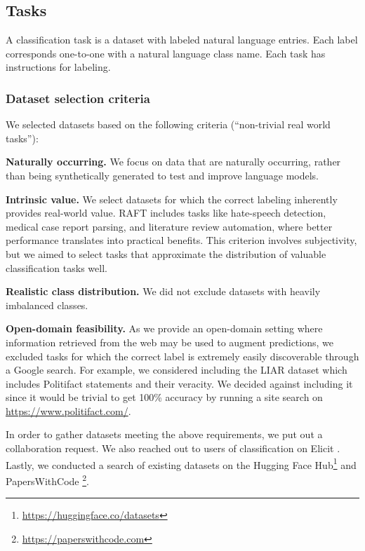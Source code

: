 \documentclass{article}
\newcommand{\name}{\textsc{RAFT}}
\begin{document}
\subsection{Tasks}

A classification task is a dataset with labeled natural language entries. Each label corresponds one-to-one with a natural language class name. Each task has instructions for labeling.

\subsubsection{Dataset selection criteria}
\label{sec:dataset-selection}

We selected datasets based on the following criteria (``non-trivial real world tasks''):

\textbf{Naturally occurring.} We focus on data that are naturally occurring, rather than being synthetically generated to test and improve language models.

\textbf{Intrinsic value.} We select datasets for which the correct labeling inherently provides real-world value.  \name{} includes tasks like hate-speech detection, medical case report parsing, and literature review automation, where better performance translates into practical benefits. This criterion involves subjectivity, but we aimed to select tasks that approximate the distribution of valuable classification tasks well.

\textbf{Realistic class distribution.} We did not exclude datasets with heavily imbalanced classes.

\textbf{Open-domain feasibility.} As we provide an open-domain setting where information retrieved from the web may be used to augment predictions, we excluded tasks for which the correct label is extremely easily discoverable through a Google search. For example, we considered including the LIAR \citep{wang-2017-liar} dataset which includes Politifact statements and their veracity. We decided against including it since it would be trivial to get 100\% accuracy by running a site search on \href{https://www.politifact.com/}{https://www.politifact.com/}.

In order to gather datasets meeting the above requirements, we put out a collaboration request. We also reached out to users of classification on Elicit \citep{elicit}. Lastly, we conducted a search of existing datasets on the Hugging Face Hub\footnote{\href{https://huggingface.co/datasets}{https://huggingface.co/datasets}} and PapersWithCode \footnote{\href{https://paperswithcode.com}{https://paperswithcode.com}}.
\end{document}
